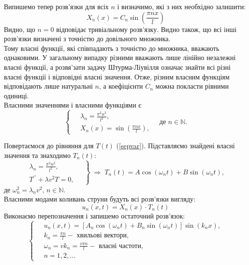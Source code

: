Випишемо тепер розв'язки для всіх $n$ і визначимо, які з них необхідно залишити:
    \begin{equation*}
        X_n(x) = C_n \sin\left(\frac{\pi n x}{l}\right)
    \end{equation*}
    Видно, що $n = 0$ відповідає тривіальному розв'язку. Видно також, що всі інші розв'язки визначені з точністю до довільного множника.\\
    Тому власні функції, які співпадають з точністю до множника, вважають однаковими. У загальному випадку різними вважають лише лінійно незалежні власні функції, а розвя'зати задачу Штурма-Ліувілля означає знайти всі різні власні функції і відповідні власні значення. Отже, різним власним функціям відповідають лише натуральні $n$, а коефіцієнти $C_n$ можна покласти рівними одиниці.\\
    Власними значеннями і власними функціями є
    \begin{equation} \label{ShLsol}
        \left\{ \begin{aligned}
            \;&\lambda_n = \frac{\pi^2 n^2}{l^2},\\ 
            &X_n(x) = \sin\left(\frac{\pi n x}{l}\right),
        \end{aligned} \right.
        \quad \text{де } n \in \mathbb{N}.
    \end{equation}

Повертаємося до рівняння для $T(t)$ (\ref{sepvar}). Підставляємо знайдені власні значення та знаходимо $T_n(t)$:
\begin{equation*}
    \left. \begin{aligned}
        \lambda_n = \frac{\pi^2 n^2}{l^2},&\;\\ 
        T^{\prime\prime} + \lambda v^2T = 0,&
    \end{aligned} \right\}
    \;\Rightarrow\;
    T_n(t) = A\cos(\omega_n t) + B\sin(\omega_n t),
\end{equation*}
де $\omega_n^2 = \lambda_n v^2, \, n \in \mathbb{N}.$\\
Власними модами коливань струни будуть всі розв'язки вигляду:
\begin{equation*}
    u_n(x,t) = X_n(x) \cdot T_n(t)
\end{equation*}
Виконаємо перепозначення і запишемо остаточний розв'язок:
\begin{equation}
    \left\{ \begin{aligned} \label{sol1}
        \;&u_n(x,t) = \left[A_n\cos(\omega_n t) + B_n\sin(\omega_n t)\right] \sin(k_n x), \\
        &k_n = \frac{\pi n}{l} - \text{ хвильові вектори}, \\
        &\omega_n = vk_n = \frac{v \pi n}{l} - \text{ власні частоти}, \\
        &n = 1, 2,\ldots
    \end{aligned}\right.
\end{equation}

